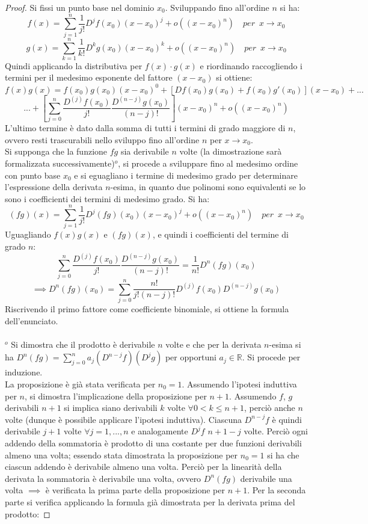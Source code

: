 \documentclass[10pt]{article}
\theoremstyle{plain}
\begin{document}
\begin{proof}
Si fissi un punto base nel dominio $x_0$. Sviluppando fino all'ordine $n$ si ha:
\[f(x) = \sum \limits_{j = 1}^n \frac{1}{j!}D^{j}f(x_0) (x - x_0)^j + o((x-x_0)^n) \quad per \enspace x \rightarrow x_0\]
\[g(x) = \sum \limits_{k = 1}^n \frac{1}{k!}D^{k}g(x_0) (x - x_0)^k + o((x-x_0)^n) \quad per \enspace x \rightarrow x_0\]
Quindi applicando la distributiva per $f(x) \cdot g(x)$ e riordinando raccogliendo i termini per il medesimo esponente del fattore $(x - x_0)$ si ottiene:
\[f(x) g(x) = f(x_0) g(x_0) (x-x_0)^0 + [Df(x_0) g(x_0) + f(x_0) g'(x_0)](x-x_0) + ... \]
\[ ... + [\sum \limits_{j=0}^{n} \frac{D^{(j)}f(x_0)}{j!} \frac{D^{(n-j)}g(x_0)}{(n-j)!}](x-x_0)^n + o((x-x_0)^n)\]
L'ultimo termine è dato dalla somma di tutti i termini di grado maggiore di $n$, ovvero resti trascurabili nello sviluppo fino all'ordine $n$ per $x \rightarrow x_0$.
\\Si supponga che la funzione $fg$ sia derivabile $n$ volte (la dimostrazione sarà formalizzata successivamente)\hyperlink{dopo}{$^o$}, si procede a sviluppare fino al medesimo ordine con punto base $x_0$ e si eguagliano i termine di medesimo grado per determinare l'espressione della derivata $n$-esima, in quanto due polinomi sono equivalenti se lo sono i coefficienti dei termini di medesimo grado. Si ha:
\[(fg)(x) = \sum \limits_{j = 1}^n \frac{1}{j!}D^{j}(fg)(x_0) (x - x_0)^j + o((x-x_0)^n) \quad per \enspace x \rightarrow x_0\]
Uguagliando $f(x)g(x)$ e $(fg)(x)$, e quindi i coefficienti del termine di grado $n$:
\[\sum \limits_{j=0}^{n} \frac{D^{(j)}f(x_0)}{j!} \frac{D^{(n-j)}g(x_0)}{(n-j)!} = \frac{1}{n!}D^{n}(fg)(x_0)\]
\[\implies D^{n}(fg)(x_0) = \sum \limits_{j=0}^{n} \frac{n!}{j! (n-j)!} D^{(j)}f(x_0) D^{(n-j)}g(x_0)\]
Riscrivendo il primo fattore come coefficiente binomiale, si ottiene la formula dell'enunciato.
\\~\\\hypertarget{dopo}{$^o$} Si dimostra che il prodotto è derivabile $n$ volte e che per la derivata $n$-esima si ha $D^n(fg) = \sum \limits_{j=0}^{n} a_j (D^{n-j}f)(D^jg)$ per opportuni $a_j \in \mathbb{R}$. Si procede per induzione.
\\La proposizione è già stata verificata per $n_0 = 1$. Assumendo l'ipotesi induttiva per $n$, si dimostra l'implicazione della proposizione per $n+1$. Assumendo $f$, $g$ derivabili $n+1$ si implica siano derivabili $k$ volte $\forall 0 < k \leq n+1$, perciò anche $n$ volte (dunque è possibile applicare l'ipotesi induttiva). Ciascuna $D^{n-j}f$ è quindi derivabile $j+1$ volte $\forall j = 1, ..., n$ e analogamente $D^{j}f$ $n+1-j$ volte. Perciò ogni addendo della sommatoria è prodotto di una costante per due funzioni derivabili almeno una volta; essendo stata dimostrata la proposizione per $n_0 = 1$ si ha che ciascun addendo è derivabile almeno una volta. Perciò per la linearità della derivata la sommatoria è derivabile una volta, ovvero $D^n(fg)$ derivabile una volta $\implies$ è verificata la prima parte della proposizione per $n+1$. Per la seconda parte si verifica applicando la formula già dimostrata per la derivata prima del prodotto:

\end{proof}
\end{document}
